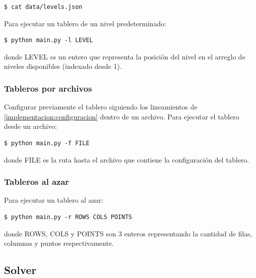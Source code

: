 \documentclass[letter,12pt]{article}
\begin{document}
\begin{verbatim}
$ cat data/levels.json
\end{verbatim}

Para ejecutar un tablero de un nivel predeterminado: \par

\begin{verbatim}
$ python main.py -l LEVEL
\end{verbatim}

donde \textsc{LEVEL} es un entero que representa la posición del nivel en el arreglo de niveles disponibles (indexado desde 1). \par

\subsubsection{Tableros por archivos} \label{documentacion:ejecucion:archivos}

Configurar previamente el tablero siguiendo los lineamientos de \ref{implementacion:configuracion} dentro de un archivo. Para ejecutar el tablero desde un archivo: \par

\begin{verbatim}
$ python main.py -f FILE
\end{verbatim}

donde \textsc{FILE} es la ruta hasta el archivo que contiene la configuración del tablero. \par

\subsubsection{Tableros al azar} \label{documentacion:ejecucion:azar}

Para ejecutar un tablero al azar: \par

\begin{verbatim}
$ python main.py -r ROWS COLS POINTS
\end{verbatim}

donde \textsc{ROWS}, \textsc{COLS} y \textsc{POINTS} son 3 enteros representando la cantidad de filas, columnas y puntos respectivamente. \par

\subsection{Solver} \label{documentacion:solver}
\end{document}
